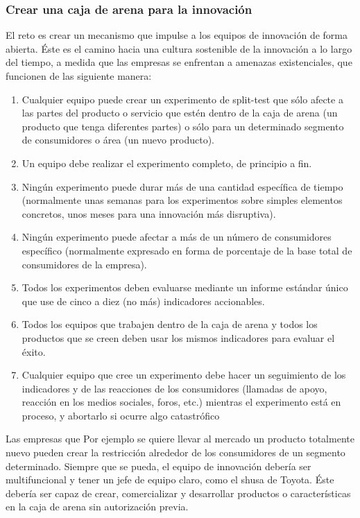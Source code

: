 \documentclass[10pt]{article}
\begin{document}
\begin{multicols}{2}
\subsubsection*{Crear una caja de arena para la innovación}
El reto es crear un mecanismo que impulse a los equipos de innovación de forma abierta. Éste es el camino hacia una cultura sostenible de la innovación a lo largo del tiempo, a medida que las empresas se enfrentan a amenazas existenciales, que funcionen de las siguiente manera:
\begin{enumerate}[\bfseries 1.]
\item Cualquier equipo puede crear un experimento de split-test que sólo afecte a las partes del producto o servicio que estén dentro de la caja de arena (un producto que tenga diferentes partes) o sólo para un determinado segmento de consumidores o área (un nuevo producto).
\item Un equipo debe realizar el experimento completo, de principio a fin.
\item Ningún experimento puede durar más de una cantidad específica de tiempo (normalmente unas semanas para los experimentos sobre simples elementos concretos, unos meses para una innovación más disruptiva).
\item Ningún experimento puede afectar a más de un número de consumidores específico (normalmente expresado en forma de porcentaje de la base total de consumidores de la empresa).
\item Todos los experimentos deben evaluarse mediante un informe estándar único que use de cinco a diez (no más) indicadores accionables.
\item Todos los equipos que trabajen dentro de la caja de arena y todos los productos que se creen deben usar los mismos indicadores para evaluar el éxito.
\item Cualquier equipo que cree un experimento debe hacer un seguimiento de los indicadores y de las reacciones de los consumidores (llamadas de apoyo, reacción en los medios sociales, foros, etc.) mientras el experimento está en proceso, y abortarlo si ocurre algo catastrófico
\end{enumerate}
Las empresas que
Por ejemplo se quiere llevar al mercado un producto totalmente nuevo pueden crear la restricción alrededor de los consumidores de un segmento determinado.
{\color{blue}Siempre que se pueda, el equipo de innovación debería ser multifuncional y tener un jefe de equipo claro, como el shusa de Toyota. Éste debería ser capaz de crear, comercializar y desarrollar productos o características en la caja de arena sin autorización previa.}

\end{multicols}
\end{document}
